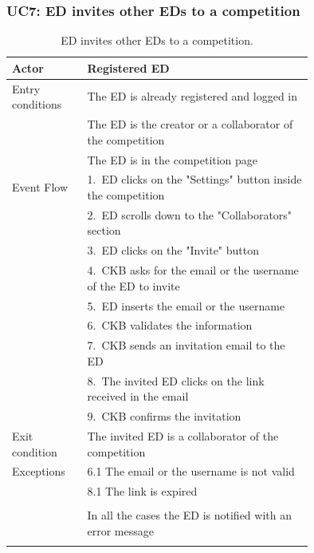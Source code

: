 \subsubsection*{UC7: ED invites other EDs to a competition}
\begin{center}
  \begin{longtable}{l|p{0.75\linewidth}}
    \hline
    Actor & Registered ED \\
    \hline
    Entry conditions & The ED is already registered and logged in  \\
    & The ED is the creator or a collaborator of the competition \\
    & The ED is in the competition page \\
    \hline
    Event Flow & 1.\ ED clicks on the "Settings" button inside the competition\\
    & 2.\ ED scrolls down to the "Collaborators" section \\
    & 3.\ ED clicks on the "Invite" button \\
    & 4.\ CKB asks for the email or the username of the ED to invite \\
    & 5.\ ED inserts the email or the username \\
    & 6.\ CKB validates the information \\
    & 7.\ CKB sends an invitation email to the ED \\
    & 8.\ The invited ED clicks on the link received in the email \\
    & 9.\ CKB confirms the invitation  \\
    \hline
    Exit condition & The invited ED is a collaborator of the competition \\
    \hline
    Exceptions & 6.1 The email or the username is not valid \\
    & 8.1 The link is expired \\ \\
    & In all the cases the ED is notified with an error message \\
    \hline
    \caption{ED invites other EDs to a competition.}
    \label{tab: ED_invite_ED}
  \end{longtable}


\end{center}

